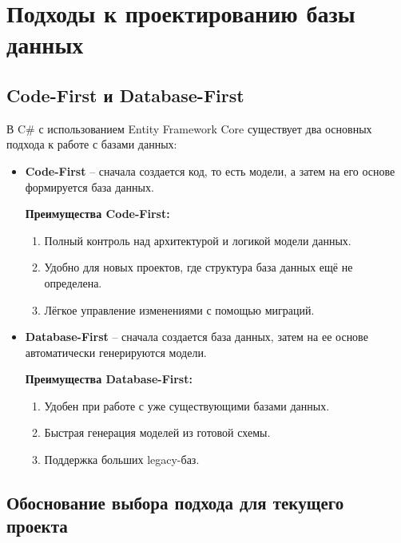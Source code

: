 \documentclass[a4paper,12pt]{report}
\begin{document}
\section{Подходы к проектированию базы данных}

\subsection{Code-First и Database-First}

В C\# с использованием Entity Framework Core существует два основных подхода к работе с базами данных:
\begin{itemize}
    \item
        \textbf{Code-First} -- сначала создается код, то есть модели, а затем на его основе формируется база данных.

        \textbf{Преимущества Code-First:}
        \begin{enumerate}
                    \item
                        Полный контроль над архитектурой и логикой модели данных.
                    \item
                        Удобно для новых проектов, где структура база данных ещё не определена.
                    \item
                        Лёгкое управление изменениями с помощью миграций.
        \end{enumerate}
    \item
        \textbf{Database-First} -- сначала создается база данных, затем на ее основе автоматически генерируются модели.

        \textbf{Преимущества Database-First:}
        \begin{enumerate}
                    \item
                        Удобен при работе с уже существующими базами данных.
                    \item
                        Быстрая генерация моделей из готовой схемы.
                    \item
                        Поддержка больших legacy-баз.
        \end{enumerate}
\end{itemize}

\subsection{Обоснование выбора подхода для текущего проекта}
\end{document}
